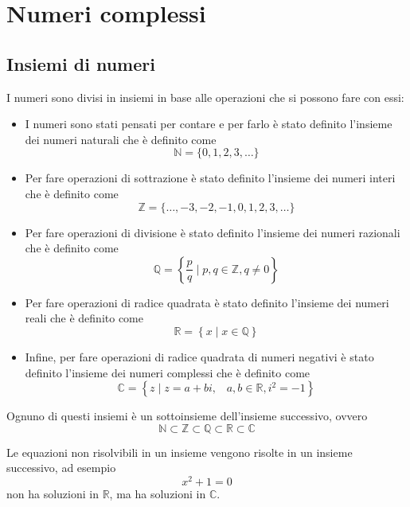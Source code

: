 \documentclass[a4paper]{article}
\theoremstyle{break}
\theoremstyle{break}
\theoremstyle{break}
\theoremstyle{break}
\begin{document}


\tableofcontents
\pagebreak


\section{Numeri complessi}
\subsection{Insiemi di numeri}
I numeri sono divisi in insiemi in base alle operazioni che si possono fare con essi:
\begin{itemize}
	\item
	      I numeri sono stati pensati per contare e per farlo è stato definito l'insieme dei numeri naturali
	      che è definito come \[  \mathbb{N} = \{0, 1, 2, 3, \ldots\} \]
	\item
	      Per fare operazioni di sottrazione è stato definito l'insieme dei numeri interi che è
	      definito come \[ \mathbb{Z} = \{\ldots, -3, -2, -1, 0, 1, 2, 3, \ldots\} \]
	\item
	      Per fare operazioni di divisione è stato definito l'insieme dei numeri razionali che è
	      definito come \[ \mathbb{Q} = \left\{ \frac{p}{q} \mid p, q \in \mathbb{Z}, q \neq 0 \right\} \]
	\item
	      Per fare operazioni di radice quadrata è stato definito l'insieme dei numeri reali che è
	      definito come \[ \mathbb{R} = \left\{ x \mid x \in \mathbb{Q} \right\} \]
	\item
	      Infine, per fare operazioni di radice quadrata di numeri negativi è stato definito
	      l'insieme dei numeri complessi che è definito come
	      \[ \mathbb{C} = \left\{ z \mid z = a + bi,\;\;\; a, b \in \mathbb{R}, i^2 = -1 \right\} \]
\end{itemize}

\noindent Ognuno di questi insiemi è un sottoinsieme dell'insieme successivo, ovvero
\[ \mathbb{N} \subset \mathbb{Z} \subset \mathbb{Q} \subset \mathbb{R} \subset \mathbb{C} \]

\noindent Le equazioni non risolvibili in un insieme vengono risolte in un insieme successivo, ad esempio
\[ x^2 + 1 = 0 \] non ha soluzioni in $\mathbb{R}$, ma ha soluzioni in $\mathbb{C}$.
\end{document}
